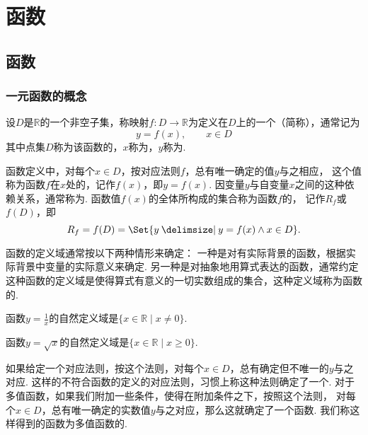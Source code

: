 \chapter{函数}
\section{函数}
\subsection{一元函数的概念}
\begin{definition}
设\(D\)是\(\mathbb{R}\)的一个非空子集，称映射\(f\colon D \to \mathbb{R}\)为定义在\(D\)上的一个（简称），通常记为\[
y = f(x), \qquad x \in D
\]其中点集\(D\)称为该函数的，\(x\)称为，\(y\)称为.

函数定义中，对每个\(x \in D\)，按对应法则\(f\)，总有唯一确定的值\(y\)与之相应，%
这个值称为函数\(f\)在\(x\)处的，记作\(f(x)\)，即\(y=f(x)\).
因变量\(y\)与自变量\(x\)之间的这种依赖关系，通常称为.
函数值\(f(x)\)的全体所构成的集合称为函数\(f\)的，%
记作\(R_f\)或\(f(D)\)，即\[
R_f = f(D) = \Set{ y \given y = f(x) \land x \in D }.
\]

函数的定义域通常按以下两种情形来确定：
一种是对有实际背景的函数，根据实际背景中变量的实际意义来确定.
另一种是对抽象地用算式表达的函数，通常约定这种函数的定义域是使得算式有意义的一切实数组成的集合，这种定义域称为函数的.
\end{definition}

\begin{example}
函数\(y = \frac{1}{x}\)的自然定义域是\(\{ x \in \mathbb{R} \mid x \neq 0 \}\).
\end{example}

\begin{example}
函数\(y = \sqrt{x}\)的自然定义域是\(\{ x \in \mathbb{R} \mid x \geq 0 \}\).
\end{example}

\begin{definition}
如果给定一个对应法则，按这个法则，对每个\(x \in D\)，总有确定但不唯一的\(y\)与之对应.
这样的不符合函数的定义的对应法则，习惯上称这种法则确定了一个.
对于多值函数，如果我们附加一些条件，使得在附加条件之下，按照这个法则，%
对每个\(x \in D\)，总有唯一确定的实数值\(y\)与之对应，那么这就确定了一个函数.
我们称这样得到的函数为多值函数的.
\end{definition}

